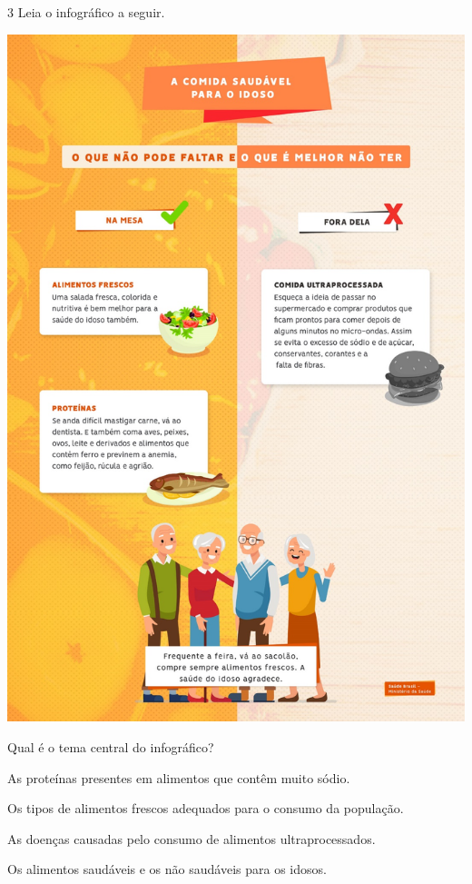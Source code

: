 \num{3} Leia o infográfico a seguir.

\begin{center}
\includegraphics[width=.8\textwidth]{media/image38.jpeg}
\end{center}



Qual é o tema central do infográfico?

\begin{escolha}
\item As proteínas presentes em alimentos que contêm muito sódio.

\item Os tipos de alimentos frescos adequados para o consumo da população.

\item As doenças causadas pelo consumo de alimentos ultraprocessados.

\item Os alimentos saudáveis e os não saudáveis para os idosos.
\end{escolha}


